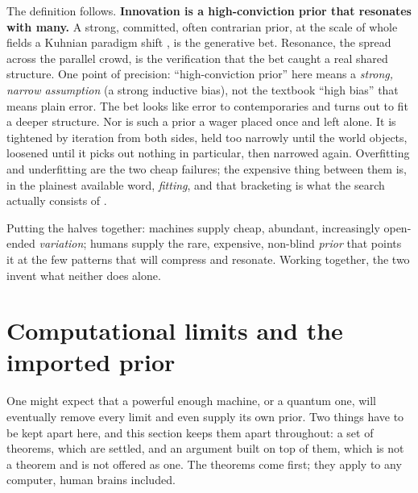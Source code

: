 \documentclass[11pt]{article}
\begin{document}
The definition follows. \textbf{Innovation is a high-conviction prior that resonates with
many.} A strong, committed, often contrarian prior, at the scale of whole fields a Kuhnian paradigm shift
\cite{kuhn1962}, is the generative bet. Resonance, the spread across the parallel crowd, is the verification that the bet
caught a real shared structure. One point of precision: ``high-conviction prior'' here means a
\emph{strong, narrow assumption} (a strong inductive bias), not the textbook ``high bias'' that means
plain error. The bet looks like error to contemporaries and turns out to fit a deeper structure. Nor
is such a prior a wager placed once and left alone. It is tightened by iteration from both sides,
held too narrowly until the world objects, loosened until it picks out nothing in particular, then
narrowed again. Overfitting and underfitting are the two cheap failures; the expensive thing between
them is, in the plainest available word, \emph{fitting}, and that bracketing is what the search
actually consists of \cite{gavrilov_compressors}.

Putting the halves together: machines supply cheap, abundant, increasingly open-ended
\emph{variation}; humans supply the rare, expensive, non-blind \emph{prior} that points it at the few
patterns that will compress and resonate. Working together, the two invent what neither does alone.

\section{Computational limits and the imported prior}
\label{sec:limits}
One might expect that a powerful enough machine, or a quantum one, will eventually remove every limit
and even supply its own prior. Two things have to be kept apart here, and this section keeps them
apart throughout: a set of theorems, which are settled, and an argument built on top of them, which is
not a theorem and is not offered as one. The theorems come first; they apply to any computer, human
brains included.
\end{document}
